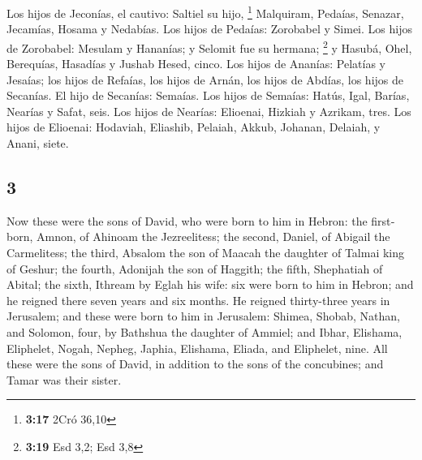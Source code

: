 \begin{paracol}{2}
 Los hijos de Jeconías, el cautivo: Saltiel su hijo,
\footnote{\textbf{3:17} 2Cró 36,10}  Malquiram, Pedaías,
Senazar, Jecamías, Hosama y Nedabías.  Los hijos de
Pedaías: Zorobabel y Simei. Los hijos de Zorobabel: Mesulam y Hananías;
y Selomit fue su hermana; \footnote{\textbf{3:19} Esd 3,2; Esd 3,8}
 y Hasubá, Ohel, Berequías, Hasadías y Jushab Hesed,
cinco.  Los hijos de Ananías: Pelatías y Jesaías; los
hijos de Refaías, los hijos de Arnán, los hijos de Abdías, los hijos de
Secanías.  El hijo de Secanías: Semaías. Los hijos de
Semaías: Hatús, Igal, Barías, Nearías y Safat, seis.  Los
hijos de Nearías: Elioenai, Hizkiah y Azrikam, tres.  Los
hijos de Elioenai: Hodaviah, Eliashib, Pelaiah, Akkub, Johanan, Delaiah,
y Anani, siete.

\switchcolumn
\begin{otherlanguage}{english}

\hypertarget{section-5}{%
\section{3}\label{section-5}}

 Now these were the sons of David, who were born to him in
Hebron: the firstborn, Amnon, of Ahinoam the Jezreelitess; the second,
Daniel, of Abigail the Carmelitess;  the third, Absalom
the son of Maacah the daughter of Talmai king of Geshur; the fourth,
Adonijah the son of Haggith;  the fifth, Shephatiah of
Abital; the sixth, Ithream by Eglah his wife:  six were
born to him in Hebron; and he reigned there seven years and six months.
He reigned thirty-three years in Jerusalem;  and these
were born to him in Jerusalem: Shimea, Shobab, Nathan, and Solomon,
four, by Bathshua the daughter of Ammiel;  and Ibhar,
Elishama, Eliphelet,  Nogah, Nepheg, Japhia,
 Elishama, Eliada, and Eliphelet, nine.  All
these were the sons of David, in addition to the sons of the concubines;
and Tamar was their sister.


\end{otherlanguage}
\end{paracol}
